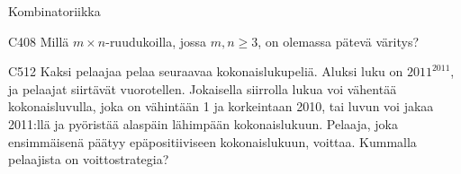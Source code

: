 \begin{bwField}{Kombinatoriikka}
\begin{bwProblem}{C}{4}{08}
Millä $m\times n$-ruudukoilla, jossa $m,n\ge 3$, on olemassa
pätevä väritys?
\end{bwProblem}

\goodbreak

\begin{bwProblem}{C}{5}{12}
Kaksi pelaajaa pelaa seuraavaa kokonaislukupeliä.
Aluksi luku on $2011^{2011}$, ja pelaajat siirtävät vuorotellen.
Jokaisella siirrolla lukua voi vähentää kokonaisluvulla,
joka on vähintään 1 ja korkeintaan 2010, tai luvun voi jakaa 2011:llä
ja pyöristää alaspäin lähimpään kokonaislukuun. Pelaaja, joka
ensimmäisenä päätyy epäpositiiviseen kokonaislukuun, voittaa. 
Kummalla pelaajista on voittostrategia?
\end{bwProblem}
  
\end{bwField}
